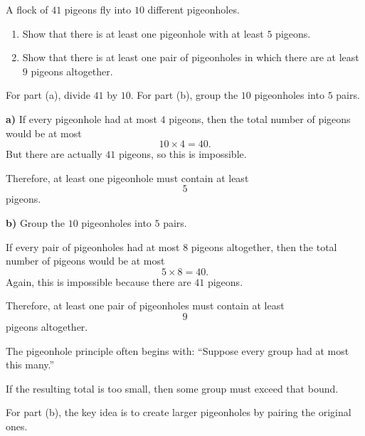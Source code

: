 \begin{problem}
A flock of $41$ pigeons fly into $10$ different pigeonholes.

\begin{enumerate}[label=\alph*)]
\item Show that there is at least one pigeonhole with at least $5$ pigeons.
\item Show that there is at least one pair of pigeonholes in which there are at least $9$ pigeons altogether.
\end{enumerate}
\end{problem}

\begin{hint}
For part (a), divide $41$ by $10$. For part (b), group the $10$ pigeonholes into $5$ pairs.
\end{hint}

\begin{solution}
\textbf{a)} If every pigeonhole had at most $4$ pigeons, then the total number of pigeons would be at most
\[
10\times 4=40.
\]
But there are actually $41$ pigeons, so this is impossible.

Therefore, at least one pigeonhole must contain at least
\[
\boxed{5}
\]
pigeons.

\textbf{b)} Group the $10$ pigeonholes into $5$ pairs.

If every pair of pigeonholes had at most $8$ pigeons altogether, then the total number of pigeons would be at most
\[
5\times 8=40.
\]
Again, this is impossible because there are $41$ pigeons.

Therefore, at least one pair of pigeonholes must contain at least
\[
\boxed{9}
\]
pigeons altogether.
\end{solution}

\begin{takeaways}
\item The pigeonhole principle often begins with: ``Suppose every group had at most this many.''
\item If the resulting total is too small, then some group must exceed that bound.
\item For part (b), the key idea is to create larger pigeonholes by pairing the original ones.
\end{takeaways}
